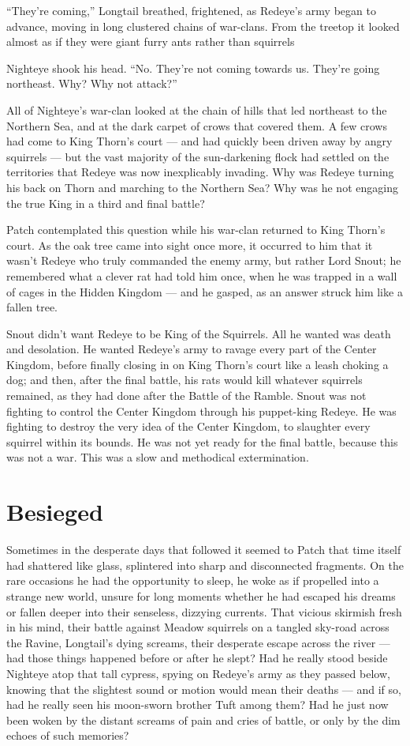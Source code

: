 \documentclass[12pt]{memoir}
\begin{document}
“They’re coming,” Longtail breathed, frightened, as Redeye’s army
began to advance, moving in long clustered chains of war-clans. From
the treetop it looked almost as if they were giant furry ants rather
than squirrels

Nighteye shook his head. “No. They’re not coming towards us. They’re
going northeast. Why? Why not attack?”

All of Nighteye’s war-clan looked at the chain of hills that led
northeast to the Northern Sea, and at the dark carpet of crows that
covered them. A few crows had come to King Thorn’s court — and had
quickly been driven away by angry squirrels — but the vast majority of
the sun-darkening flock had settled on the territories that Redeye was
now inexplicably invading. Why was Redeye turning his back on Thorn
and marching to the Northern Sea? Why was he not engaging the true
King in a third and final battle?

Patch contemplated this question while his war-clan returned to King
Thorn’s court. As the oak tree came into sight once more, it occurred
to him that it wasn’t Redeye who truly commanded the enemy army, but
rather Lord Snout; he remembered what a clever rat had told him once,
when he was trapped in a wall of cages in the Hidden Kingdom — and he
gasped, as an answer struck him like a fallen tree.

Snout didn’t want Redeye to be King of the Squirrels. All he wanted
was death and desolation. He wanted Redeye’s army to ravage every part
of the Center Kingdom, before finally closing in on King Thorn’s court
like a leash choking a dog; and then, after the final battle, his rats
would kill whatever squirrels remained, as they had done after the
Battle of the Ramble. Snout was not fighting to control the Center
Kingdom through his puppet-king Redeye. He was fighting to destroy the
very idea of the Center Kingdom, to slaughter every squirrel within
its bounds. He was not yet ready for the final battle, because this
was not a war. This was a slow and methodical extermination.


\section{Besieged}

Sometimes in the desperate days that followed it seemed to Patch that
time itself had shattered like glass, splintered into sharp and
disconnected fragments. On the rare occasions he had the opportunity
to sleep, he woke as if propelled into a strange new world, unsure for
long moments whether he had escaped his dreams or fallen deeper into
their senseless, dizzying currents. That vicious skirmish fresh in his
mind, their battle against Meadow squirrels on a tangled sky-road
across the Ravine, Longtail’s dying screams, their desperate escape
across the river — had those things happened before or after he slept?
Had he really stood beside Nighteye atop that tall cypress, spying on
Redeye’s army as they passed below, knowing that the slightest sound
or motion would mean their deaths — and if so, had he really seen his
moon-sworn brother Tuft among them? Had he just now been woken by the
distant screams of pain and cries of battle, or only by the dim echoes
of such memories?
\end{document}
